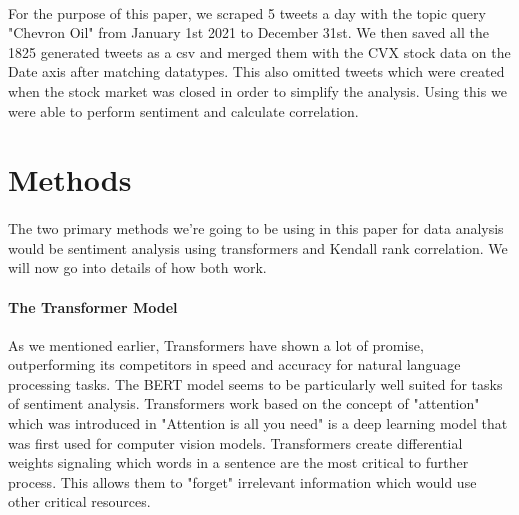 \documentclass[12pt, letterpaper, titlepage]{article}
\begin{document}
\paragraph{}
	For the purpose of this paper, we scraped 5 tweets a day with the topic query "Chevron Oil" from January 1st 2021 to December 31st.  We then saved all the 1825 generated tweets as a csv and merged them with the CVX stock data on the Date axis after matching datatypes. This also omitted tweets which were created when the stock market was closed in order to simplify the analysis. Using this we were able to perform sentiment and calculate correlation.


\label{sec: methods}
\section{Methods}

\paragraph{}
	The two primary methods we're going to be using in this paper for data analysis would be sentiment analysis using transformers and Kendall rank correlation. We will now go into details of how both work.


\paragraph{The Transformer Model}
	As we mentioned earlier, Transformers have shown a lot of promise, outperforming its competitors in speed and accuracy for natural language processing tasks. The BERT model seems to be particularly well suited for tasks of sentiment analysis. Transformers work based on the concept of "attention" which was introduced in "Attention is all you need" \citep{vaswani2017attention} is a deep learning model that was first used for computer vision models. Transformers create differential weights signaling which words in a sentence are the most critical to further process. This allows them to "forget"  irrelevant information which would use other critical resources.
	
\end{document}
